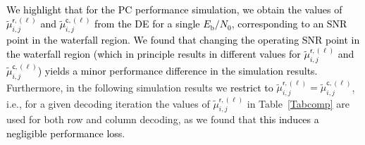\documentclass[journal]{IEEEtran}
\newcommand{\row}{\mathsf{r}}
\newcommand{\col}{\mathsf{c}}
\newcommand{\mut}{\tilde{\mu}}
\newcommand{\SH}{\textcolor{black}}
\newcommand{\GL}{\textcolor{black}}
\newcommand{\AG}{\textcolor{black}}
\newcommand{\GLC}[1]{\textcolor{black}{\textbf{\textit{#1}}}}
\begin{document}

\SH{We highlight that for the PC performance simulation, we obtain the values of $\mut _{i,j}^{\row,(\ell )}$ and $\mut _{i,j}^{\col,(\ell )}$ from the DE for a single $E_\mathrm{b}/N_0$, corresponding to an SNR point in the waterfall region. We found that changing the operating SNR point in the waterfall region (which in principle results in different values for $\mut _{i,j}^{\row,(\ell )}$ and $\mut _{i,j}^{\col,(\ell )}$) yields a minor performance difference in the simulation results.} Furthermore, in the following simulation results we \GL{restrict to} $\mut _{i,j}^{\row,(\ell )}=\mut _{i,j}^{\col,(\ell )}$, i.e., for a given decoding iteration the values of $\mut _{i,j}^{\row,(\ell )}$ in Table~\ref{Tabcomp} are used for both row and column decoding, as we found that \AG{this induces a negligible performance loss}.
\end{document}
